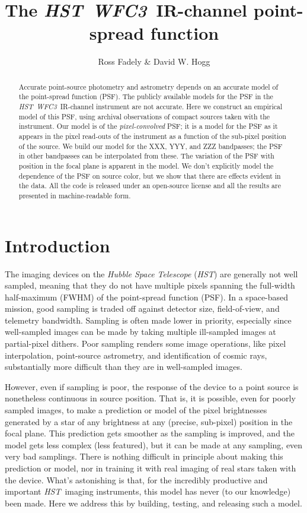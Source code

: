 \documentclass[12pt,letterpaper,preprint]{aastex}
\newcommand{\instrument}[1]{\textsl{#1}}
\newcommand{\HST}{\instrument{HST}}
\newcommand{\WFC}{\instrument{WFC3}}
\begin{document}
\title{The \HST\ \WFC\ IR-channel point-spread function}
\author{Ross Fadely \& David W. Hogg}

\begin{abstract}
Accurate point-source photometry and astrometry depends on an accurate model of the point-spread function (PSF).
The publicly available models for the PSF in the \HST\ \WFC\ IR-channel instrument are not accurate.
Here we construct an empirical model of this PSF,
  using archival observations of compact sources taken with the instrument.
Our model is of the \emph{pixel-convolved} PSF;
  it is a model for the PSF as it appears in the pixel read-outs of the instrument
  as a function of the sub-pixel position of the source.
We build our model for the XXX, YYY, and ZZZ bandpasses;
  the PSF in other bandpasses can be interpolated from these.
The variation of the PSF with position in the focal plane
  is apparent in the model.
We don't explicitly model the dependence of the PSF on source color,
  but we show that there are effects evident in the data.
All the code is released under an open-source license
  and all the results are presented in machine-readable form.
\end{abstract}


\section{Introduction}

The imaging devices on the \instrument{Hubble Space Telescope} (\HST) are generally not well sampled,
  meaning that they do not have multiple pixels spanning the full-width half-maximum (FWHM)
  of the point-spread function (PSF).
In a space-based mission,
  good sampling is traded off against detector size, field-of-view, and telemetry bandwidth.
Sampling is often made lower in priority,
  especially since well-sampled images can be made by taking multiple
  ill-sampled images at partial-pixel dithers.
Poor sampling renders some image operations,
  like pixel interpolation, point-source astrometry, and identification of cosmic rays,
  substantially more difficult than they are in well-sampled images.

However, even if sampling is poor,
  the response of the device to a point source is nonetheless continuous in source position.
That is, it is possible, even for poorly sampled images,
  to make a prediction or model of the pixel brightnesses generated by
  a star of any brightness at any (precise, sub-pixel) position in the focal plane.
This prediction gets smoother as the sampling is improved,
  and the model gets less complex (less featured),
  but it can be made at any sampling, even very bad samplings.
There is nothing difficult in principle about making this prediction or model,
  nor in training it with real imaging of real stars taken with the device.
What's astonishing is that,
  for the incredibly productive and important \HST\ imaging instruments,
  this model has never (to our knowledge) been made.
Here we address this by building, testing, and releasing such a model.
\end{document}

